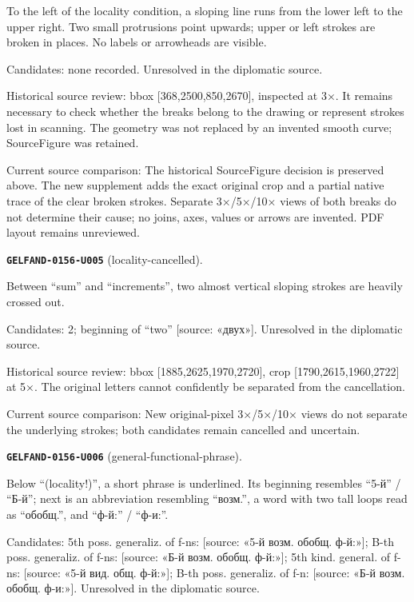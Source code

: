 To the left of the locality condition, a sloping line runs from the lower left to the upper right. Two small protrusions point upwards; upper or left strokes are broken in places. No labels or arrowheads are visible.\par
Candidates: none recorded. Unresolved in the diplomatic source.\par
Historical source review: bbox [368,2500,850,2670], inspected at 3×. It remains necessary to check whether the breaks belong to the drawing or represent strokes lost in scanning. The geometry was not replaced by an invented smooth curve; SourceFigure was retained.\par
Current source comparison: The historical SourceFigure decision is preserved above. The new supplement adds the exact original crop and a partial native trace of the clear broken strokes. Separate 3×/5×/10× views of both breaks do not determine their cause; no joins, axes, values or arrows are invented. PDF layout remains unreviewed.\par\medskip
\par\noindent\leavevmode{}\label{GELFAND-0156-U005}\label{GELFAND-P001438:locality-cancelled}\textbf{\texttt{GELFAND-0156-U005}} (locality-cancelled).\nopagebreak[4]\par
Between “sum” and “increments”, two almost vertical sloping strokes are heavily crossed out.\par
Candidates: 2; beginning of “two” [source: «двух»]. Unresolved in the diplomatic source.\par
Historical source review: bbox [1885,2625,1970,2720], crop [1790,2615,1960,2722] at 5×. The original letters cannot confidently be separated from the cancellation.\par
Current source comparison: New original-pixel 3×/5×/10× views do not separate the underlying strokes; both candidates remain cancelled and uncertain.\par\medskip
\par\noindent\leavevmode{}\label{GELFAND-0156-U006}\label{GELFAND-P001438:general-functional-phrase}\textbf{\texttt{GELFAND-0156-U006}} (general-functional-phrase).\nopagebreak[4]\par
Below “(locality!)”, a short phrase is underlined. Its beginning resembles “5-й” / “Б-й”; next is an abbreviation resembling “возм.”, a word with two tall loops read as “обобщ.”, and “ф-й:” / “ф-и:”.\par
Candidates: 5th poss. generaliz. of f-ns: [source: «5-й возм. обобщ. ф-й:»]; B-th poss. generaliz. of f-ns: [source: «Б-й возм. обобщ. ф-й:»]; 5th kind. general. of f-ns: [source: «5-й вид. общ. ф-й:»]; B-th poss. generaliz. of f-n: [source: «Б-й возм. обобщ. ф-и:»]. Unresolved in the diplomatic source.\par
